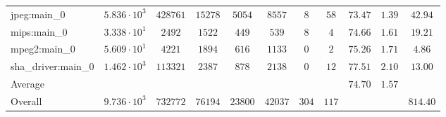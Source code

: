 \begin{tabular}{|l|c|c|c|c|c|c|c|c|c|c|}
jpeg:main\_0            & $ 5.836 \cdot 10^{3} $ & $ 428761 $ & $ 15278 $ & $ 5054  $ & $ 8557  $ & $ 8   $ & $ 58  $ & $ 73.47       $ & $ 1.39    $ & $ 42.94   $ \\
mips:main\_0            & $ 3.338 \cdot 10^{1} $ & $ 2492   $ & $ 1522  $ & $ 449   $ & $ 539   $ & $ 8   $ & $ 4   $ & $ 74.66       $ & $ 1.61    $ & $ 19.21   $ \\
mpeg2:main\_0           & $ 5.609 \cdot 10^{1} $ & $ 4221   $ & $ 1894  $ & $ 616   $ & $ 1133  $ & $ 0   $ & $ 2   $ & $ 75.26       $ & $ 1.71    $ & $ 4.86    $ \\
sha\_driver:main\_0     & $ 1.462 \cdot 10^{3} $ & $ 113321 $ & $ 2387  $ & $ 878   $ & $ 2138  $ & $ 0   $ & $ 12  $ & $ 77.51       $ & $ 2.10    $ & $ 13.00   $ \\
\hline
Average                 & $                    $ & $        $ & $       $ & $       $ & $       $ & $     $ & $     $ & $ 74.70       $ & $ 1.57    $ & $         $ \\
\hline
Overall                 & $ 9.736 \cdot 10^{3} $ & $ 732772 $ & $ 76194 $ & $ 23800 $ & $ 42037 $ & $ 304 $ & $ 117 $ & $             $ & $         $ & $ 814.40  $ \\
\hline
\end{tabular}
